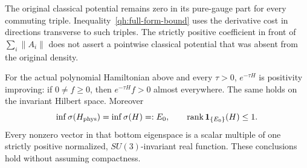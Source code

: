 The original classical potential remains zero in its pure-gauge
part for every commuting triple. Inequality~\eqref{qh:full-form-bound}
uses the derivative cost in directions transverse to such triples.
The strictly positive coefficient in front of $\sum_i\|A_i\|$
does not assert a pointwise classical potential that was absent
from the original density.

\begin{theorem}
\label{qh:hq-positive}
For the actual polynomial Hamiltonian above and every \(\tau>0\),
\(e^{-\tau H}\) is positivity improving: if \(0\ne f\geq0\), then
\(e^{-\tau H}f>0\) almost everywhere. The same holds on the invariant
Hilbert space. Moreover
\[
 \inf\sigma(H_{\rm phys})=\inf\sigma(H)=:E_0,\qquad
 \operatorname{rank}\mathbf1_{\{E_0\}}(H)\leq1.
\]
Every nonzero vector in that bottom eigenspace is a scalar multiple
of one strictly positive normalized, \(SU(3)\)-invariant real
function. These conclusions hold without assuming compactness.
\end{theorem}
